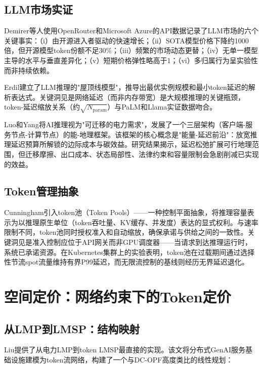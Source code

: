 \documentclass[11pt,twocolumn]{article}
\begin{document}
\subsection{LLM市场实证}

Demirer等人\cite{demirer2025emerging}使用OpenRouter和Microsoft Azure的API数据记录了LLM市场的六个关键事实：（i）由开源进入者驱动的快速增长；（ii）SOTA模型价格下降约1000倍，但开源模型token份额不足30\%；（iii）频繁的市场动态更替；（iv）无单一模型主导的水平与垂直差异化；（v）短期价格弹性略高于1；（vi）多归属行为呈实验性而非持续依赖。

Erdil\cite{erdil2025inference}建立了LLM推理的"屋顶线模型"，推导出最优实例规模和最小token延迟的解析表达式。关键洞见是网络延迟（而非内存带宽）是大规模推理的关键瓶颈，token-延迟缩放关系（约$\sqrt{N_{\text{param}}}$）与PaLM和Llama实证数据吻合。

Luo和Yang\cite{luo2026aiinference}将AI推理视为"可迁移的电力需求"，发展了一个三层架构（客户端-服务节点-计算节点）的能-地理框架。该框架的核心概念是"能量-延迟前沿"：放宽推理延迟预算所解锁的边际成本与碳效益。研究结果揭示，延迟松弛扩展可行地理范围，但迁移摩擦、出口成本、状态局部性、法律约束和容量限制会急剧削减已实现的效益。

\subsection{Token管理抽象}

Cunningham\cite{cunningham2026token}引入token池（Token Pools）——一种控制平面抽象，将推理容量表示为以推理原生单位（token吞吐量、KV缓存、并发度）表达的显式权利。与速率限制不同，token池同时授权准入和自动缩放，确保承诺与供给之间的一致性。关键洞见是准入控制应位于API网关而非GPU调度器——当请求到达推理运行时，系统已承诺资源。在Kubernetes集群上的实验表明，token池在过载期间通过选择性节流spot流量维持有界P99延迟，而无限流控制的基线则经历无界延迟退化。

\section{空间定价：网络约束下的Token定价}

\subsection{从LMP到LMSP：结构映射}

Liu\cite{liu2026locational}提供了从电力LMP到token LMSP最直接的实现。该文将分布式GenAI服务基础设施建模为token流网络，构建了一个与DC-OPF高度类比的线性规划：
\end{document}
